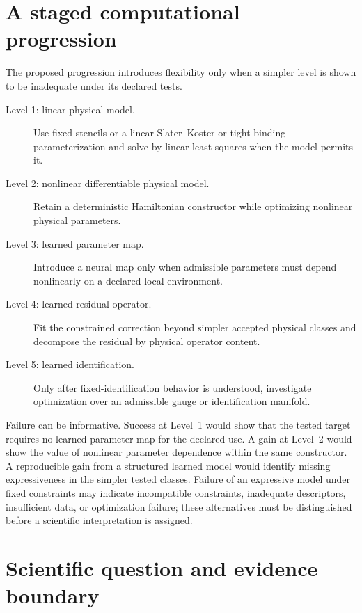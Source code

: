 \section{A staged computational progression}

The proposed progression introduces flexibility only when a simpler level is
shown to be inadequate under its declared tests.

\begin{description}
  \item[Level 1: linear physical model.] Use fixed stencils or a linear
    Slater--Koster or tight-binding parameterization and solve by linear least
    squares when the model permits it.

  \item[Level 2: nonlinear differentiable physical model.] Retain a
    deterministic Hamiltonian constructor while optimizing nonlinear physical
    parameters.
  \item[Level 3: learned parameter map.] Introduce a neural map only when
    admissible parameters must depend nonlinearly on a declared local
    environment.
  \item[Level 4: learned residual operator.] Fit the constrained correction
    beyond simpler accepted physical classes and decompose the residual by
    physical operator content.
  \item[Level 5: learned identification.] Only after fixed-identification
    behavior is understood, investigate optimization over an admissible gauge
    or identification manifold.
\end{description}

Failure can be informative. Success at Level~1 would show that the tested target
requires no learned parameter map for the declared use. A gain at Level~2 would
show the value of nonlinear parameter dependence within the same constructor.
A reproducible gain from a structured learned model would identify missing
expressiveness in the simpler tested classes. Failure of an expressive model
under fixed constraints may indicate incompatible constraints, inadequate
descriptors, insufficient data, or optimization failure; these alternatives
must be distinguished before a scientific interpretation is assigned.

\section{Scientific question and evidence boundary}

